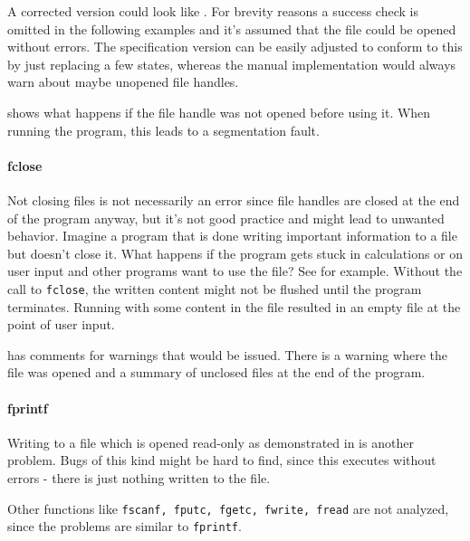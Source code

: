 A corrected version could look like .
For brevity reasons a success check is omitted in the following examples and it's assumed that the file could be opened without errors. The specification version can be easily adjusted to conform to this by just replacing a few states, whereas the manual implementation would always warn about maybe unopened file handles.

 shows what happens if the file handle was not opened before using it. When running the program, this leads to a segmentation fault.

\paragraph*{fclose}
Not closing files is not necessarily an error since file handles are closed at the end of the program anyway, but it's not good practice and might lead to unwanted behavior.
Imagine a program that is done writing important information to a file but doesn't close it. What happens if the program gets stuck in calculations or on user input and other programs want to use the file? See  for example. Without the call to \verb|fclose|, the written content might not be flushed until the program terminates. Running with some content in the file resulted in an empty file at the point of user input.

 has comments for warnings that would be issued. There is a warning where the file was opened and a summary of unclosed files at the end of the program.

\paragraph*{fprintf}
Writing to a file which is opened read-only as demonstrated in  is another problem. Bugs of this kind might be hard to find, since this executes without errors - there is just nothing written to the file.

Other functions like \verb|fscanf, fputc, fgetc, fwrite, fread| are not analyzed, since the problems are similar to \verb|fprintf|.


